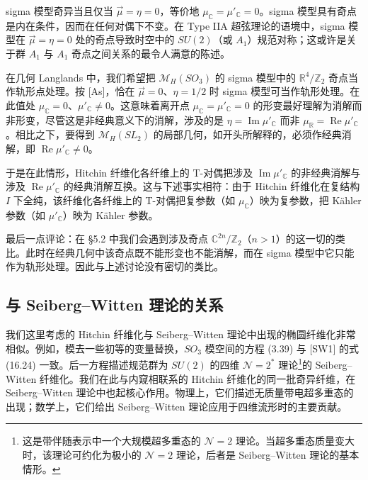 \documentclass[11pt,a4paper]{article}
\begin{document}
sigma 模型奇异当且仅当 $\vec\mu=\eta=0$，等价地 $\mu_{\mathbb{C}}=\mu'_{\mathbb{C}}=0$。sigma 模型具有奇点是内在条件，因而在任何对偶下不变。在 Type IIA 超弦理论的语境中，sigma 模型在 $\vec\mu=\eta=0$ 处的奇点导致时空中的 $SU(2)$（或 $A_1$）规范对称；这或许是关于群 $A_1$ 与 $A_1$ 奇点之间关系的最令人满意的陈述。

在几何 Langlands 中，我们希望把 $\mathcal{M}_H(SO_3)$ 的 sigma 模型中的 $\mathbb{R}^4/\mathbb{Z}_2$ 奇点当作轨形点处理。按 [As]，恰在 $\vec\mu=0$、$\eta=1/2$ 时 sigma 模型可当作轨形处理。在此值处 $\mu_{\mathbb{C}}=0$、$\mu'_{\mathbb{C}}\ne0$。这意味着离开点 $\mu_{\mathbb{C}}=\mu'_{\mathbb{C}}=0$ 的形变最好理解为消解而非形变，尽管这是非经典意义下的消解，涉及的是 $\eta=\operatorname{Im}\mu'_{\mathbb{C}}$ 而非 $\mu_{\mathbb{R}}=\operatorname{Re}\mu'_{\mathbb{C}}$。相比之下，要得到 $\mathcal{M}_H(SL_2)$ 的局部几何，如开头所解释的，必须作经典消解，即 $\operatorname{Re}\mu'_{\mathbb{C}}\ne0$。

于是在此情形，Hitchin 纤维化各纤维上的 T-对偶把涉及 $\operatorname{Im}\mu'_{\mathbb{C}}$ 的非经典消解与涉及 $\operatorname{Re}\mu'_{\mathbb{C}}$ 的经典消解互换。这与下述事实相符：由于 Hitchin 纤维化在复结构 $I$ 下全纯，该纤维化各纤维上的 T-对偶把复参数（如 $\mu_{\mathbb{C}}$）映为复参数，把 Kähler 参数（如 $\mu'_{\mathbb{C}}$）映为 Kähler 参数。

最后一点评论：在 §5.2 中我们会遇到涉及奇点 $\mathbb{C}^{2n}/\mathbb{Z}_2$（$n>1$）的这一切的类比。此时在经典几何中该奇点既不能形变也不能消解，而在 sigma 模型中它只能作为轨形处理。因此与上述讨论没有密切的类比。

\subsection{与 Seiberg--Witten 理论的关系}

我们这里考虑的 Hitchin 纤维化与 Seiberg--Witten 理论中出现的椭圆纤维化非常相似。例如，模去一些初等的变量替换，$SO_3$ 模空间的方程 (3.39) 与 [SW1] 的式 (16.24) 一致。后一方程描述规范群为 $SU(2)$ 的四维 $\mathcal{N}=2^*$ 理论\footnote{这是带伴随表示中一个大规模超多重态的 $\mathcal{N}=2$ 理论。当超多重态质量变大时，该理论可约化为极小的 $\mathcal{N}=2$ 理论，后者是 Seiberg--Witten 理论的基本情形。}的 Seiberg--Witten 纤维化。我们在此与内窥相联系的 Hitchin 纤维化的同一批奇异纤维，在 Seiberg--Witten 理论中也起核心作用。物理上，它们描述无质量带电超多重态的出现；数学上，它们给出 Seiberg--Witten 理论应用于四维流形时的主要贡献。
\end{document}
